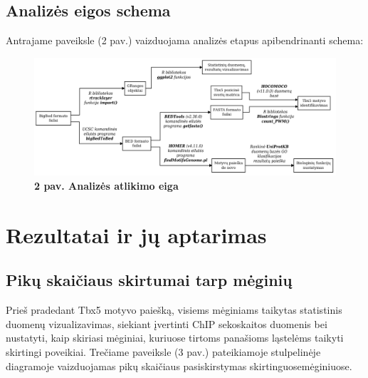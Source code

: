 \documentclass[12pt]{article}
\begin{document}
\subsection{Analizės eigos schema}
Antrajame paveiksle (2 pav.) vaizduojama analizės etapus apibendrinanti schema:
\begin{figure}[htb]
    \begin{center}
        \includegraphics[width=1\linewidth]{../Figures/analysis_scheme.png}
        \vspace{-2\baselineskip}
        \caption*{\small\textbf{2 pav. Analizės atlikimo eiga}}
    \end{center}
\end{figure}

\newpage



\section{Rezultatai ir jų aptarimas}
\subsection{Pikų skaičiaus skirtumai tarp mėginių}
Prieš pradedant Tbx5 motyvo paiešką, visiems mėginiams taikytas statistinis
duomenų vizualizavimas, siekiant įvertinti ChIP sekoskaitos duomenis bei
nustatyti, kaip skiriasi mėginiai, kuriuose tirtoms panašioms ląstelėms
taikyti skirtingi poveikiai. Trečiame paveiksle (3 pav.) pateikiamoje
stulpelinėje diagramoje vaizduojamas pikų skaičiaus pasiskirstymas
skirtinguosemėginiuose.
\end{document}

